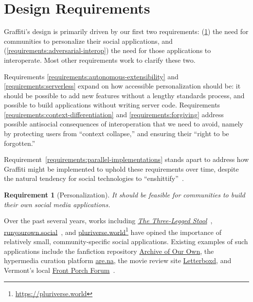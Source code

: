 \newtheorem{requirement}{Requirement}

\section{Design Requirements}
\label{requirements}

Graffiti's design is primarily driven by our
first two requirements:
(\ref{requirements:personalization})
the need for communities to personalize
their social applications,
and (\ref{requirements:adversarial-interop})
the need for those applications to interoperate.
Most other requirements work to clarify these two.

Requirements \ref{requirements:autonomous-extensibility}
and \ref{requirements:serverless} expand on how accessible
personalization should be: it should be possible to add new features
without a lengthy standards process, and possible to build
applications without writing server code.
Requirements \ref{requirements:context-differentiation}
and \ref{requirements:forgiving}
address possible antisocial consequences of
interoperation that we need to avoid,
namely by protecting users from ``context collapse,''
and ensuring their ``right to be forgotten.''

Requirement~{\ref{requirements:parallel-implementations}} stands apart to address
how Graffiti might be implemented to uphold these requirements over time, despite
the natural tendency for social technologies to ``enshittify''~{\cite{enshittification}}.

\begin{requirement}[Personalization]
\label{requirements:personalization}
   It should be feasible for communities to build
   their own social media applications.
\end{requirement}

Over the past several years,
works including
\emph{\href{https://publicinfrastructure.org/2023/03/29/the-three-legged-stool/}{The Three-Legged Stool}}~\cite{threeleggedstool},
\href{https://runyourown.social}{runyourown.social}~\cite{runyourownsocial},
and \href{https://pluriverse.world/}{pluriverse.world}\footnote{
\url{https://pluriverse.world}
}
have opined the importance of relatively small,
community-specific social applications.
Existing examples of such applications include the fanfiction
repository \href{https://archiveofourown.org/}{Archive of Our Own},
the hypermedia curation platform \href{https://www.are.na}{are.na},
the movie review site \href{https://letterboxd.com/}{Letterboxd},
and Vermont's local \href{https://frontporchforum.com/}{Front Porch Forum}~\cite{threeleggedstool}.

